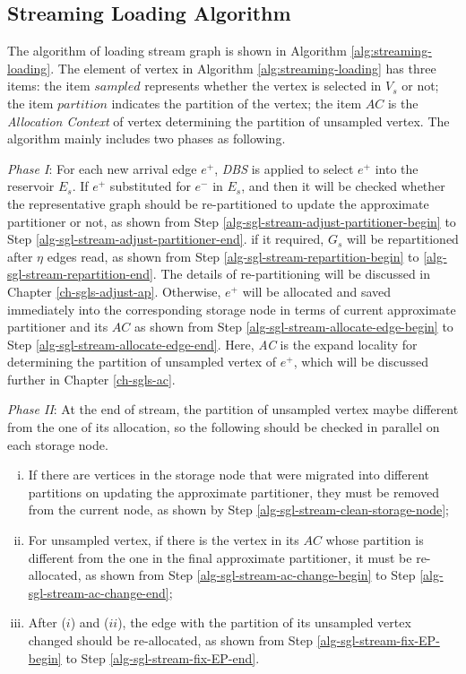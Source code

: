 \documentclass{sig-alternate-2013}
\begin{document}
\subsection {Streaming Loading Algorithm}

The algorithm of loading stream graph is shown in Algorithm \ref{alg:streaming-loading}.
The element of vertex in Algorithm \ref{alg:streaming-loading} has three items:
the item $sampled$ represents whether the vertex is selected in $V_s$ or not;
the item $partition$ indicates the partition of the vertex;
the item $AC$ is the \textit{Allocation Context} of vertex determining the partition of unsampled vertex.
The algorithm mainly includes two phases as following.

\textit{Phase I}: For each new arrival edge $e^+$, \textit{DBS} is applied to select $e^+$ into the reservoir $E_s$. If $e^+$ substituted for $e^-$ in $E_s$, and then it will be checked whether the representative graph should be re-partitioned to update the approximate partitioner or not, as shown from Step \ref{alg-sgl-stream-adjust-partitioner-begin} to Step \ref{alg-sgl-stream-adjust-partitioner-end}. if it required, $G_s$ will be repartitioned after $\eta$ edges read, as shown from Step \ref{alg-sgl-stream-repartition-begin} to \ref{alg-sgl-stream-repartition-end}. The details of re-partitioning will be discussed in Chapter \ref{ch-sgls-adjust-ap}.
Otherwise, $e^+$ will be allocated and saved  immediately into the corresponding storage node in terms of current approximate partitioner and its $AC$ as shown from Step \ref{alg-sgl-stream-allocate-edge-begin} to Step \ref{alg-sgl-stream-allocate-edge-end}.
Here, \textit{AC} is the expand locality for determining the partition of unsampled vertex of $e^+$, which will be discussed further in Chapter \ref{ch-sgls-ac}.

\textit{Phase II}:  At the end of stream, the partition of unsampled vertex maybe different from the one of its allocation, so the following should be checked in parallel on each storage node.
\begin{enumerate}[i.]
\item If there are vertices in the storage node that were migrated into different partitions on updating the approximate partitioner, they must be removed from the current node, as shown by Step \ref{alg-sgl-stream-clean-storage-node};
\item For unsampled vertex, if there is the vertex in its $AC$  whose partition is different from the one in the final approximate partitioner, it must be re-allocated, as shown from Step \ref{alg-sgl-stream-ac-change-begin} to Step \ref{alg-sgl-stream-ac-change-end};
\item After ($i$) and ($ii$), the edge with the partition of its unsampled vertex changed should be re-allocated, as shown from Step \ref{alg-sgl-stream-fix-EP-begin}  to Step \ref{alg-sgl-stream-fix-EP-end}.
\end{enumerate}
\end{document}
